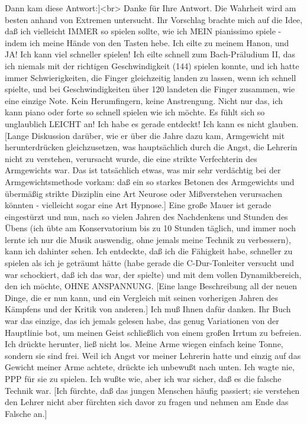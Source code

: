 Dann kam diese Antwort:]<br>
Danke für Ihre Antwort.
Die Wahrheit wird am besten anhand von Extremen untersucht.
Ihr Vorschlag brachte mich auf die Idee, daß ich vielleicht IMMER so spielen sollte, wie ich MEIN pianissimo spiele - indem ich meine Hände von den Tasten hebe.
Ich eilte zu meinem Hanon, und JA!
Ich kann viel schneller spielen!
Ich eilte schnell zum Bach-Präludium II, das ich niemals mit der richtigen Geschwindigkeit (144) spielen konnte, und ich hatte immer Schwierigkeiten, die Finger gleichzeitig landen zu lassen, wenn ich schnell spielte, und bei Geschwindigkeiten über 120 landeten die Finger zusammen, wie eine einzige Note.
Kein Herumfingern, keine Anstrengung.
Nicht nur das, ich kann piano oder forte so schnell spielen wie ich möchte.
Es fühlt sich so unglaublich LEICHT an!
Ich habe es gerade entdeckt!
Ich kann es nicht glauben.
[Lange Diskussion darüber, wie er über die Jahre dazu kam, Armgewicht mit herunterdrücken gleichzusetzen, was hauptsächlich durch die Angst, die Lehrerin nicht zu verstehen, verursacht wurde, die eine strikte Verfechterin des Armgewichts war.
Das ist tatsächlich etwas, was mir sehr verdächtig bei der Armgewichtsmethode vorkam: daß ein so starkes Betonen des Armgewichts und übermäßig strikte Disziplin eine Art Neurose oder Mißverstehen verursachen könnten - vielleicht sogar eine Art Hypnose.]
Eine große Mauer ist gerade eingestürzt und nun, nach so vielen Jahren des Nachdenkens und Stunden des Übens (ich übte am Konservatorium bis zu 10 Stunden täglich, und immer noch lernte ich nur die Musik auswendig, ohne jemals meine Technik zu verbessern), kann ich dahinter sehen.
Ich entdeckte, daß ich die Fähigkeit habe, schneller zu spielen als ich je geträumt hätte (habe gerade die C-Dur-Tonleiter versucht und war schockiert, daß ich das war, der spielte) und mit dem vollen Dynamikbereich, den ich möchte, OHNE ANSPANNUNG.
[Eine lange Beschreibung all der neuen Dinge, die er nun kann, und ein Vergleich mit seinen vorherigen Jahren des Kämpfens und der Kritik von anderen.]
Ich muß Ihnen dafür danken.
Ihr Buch war das einzige, das ich jemals gelesen habe, das genug Variationen von der Hauptlinie bot, um meinen Geist schließlich von einem großen Irrtum zu befreien.
Ich drückte herunter, ließ nicht los.
Meine Arme wiegen einfach keine Tonne, sondern sie sind frei.
Weil ich Angst vor meiner Lehrerin hatte und einzig auf das Gewicht meiner Arme achtete, drückte ich unbewußt nach unten.
Ich wagte nie, PPP für sie zu spielen.
Ich wußte wie, aber ich war sicher, daß es die falsche Technik war.
[Ich fürchte, daß das jungen Menschen häufig passiert; sie verstehen den Lehrer nicht aber fürchten sich davor zu fragen und nehmen am Ende das Falsche an.]

